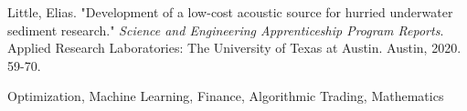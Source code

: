 Little, Elias. "Development of a low-cost acoustic source for hurried underwater sediment research."
\textit{Science and Engineering Apprenticeship Program Reports}. Applied Research Laboratories: The University of Texas at Austin.
Austin, 2020. 59-70.

Optimization, Machine Learning, Finance, Algorithmic Trading, Mathematics



\medskip
